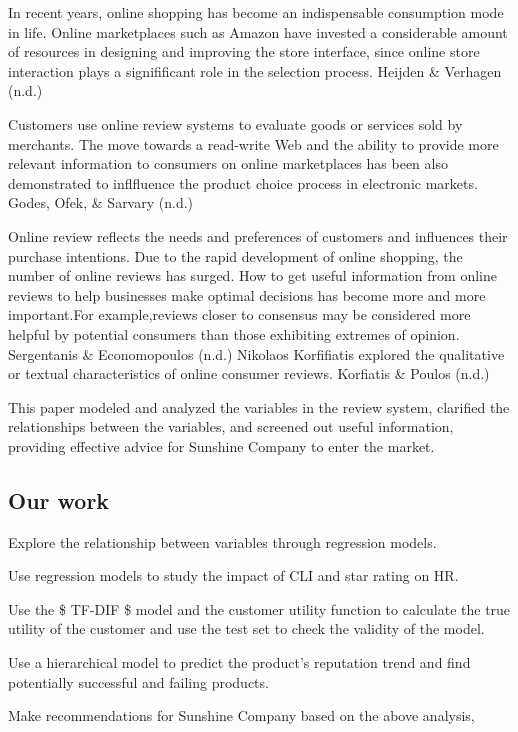 \documentclass[12pt,a4paper,]{article}
\begin{document}
In recent years, online shopping has become an indispensable consumption
mode in life. Online marketplaces such as Amazon have invested a
considerable amount of resources in designing and improving the store
interface, since online store interaction plays a signifificant role in
the selection process. Heijden \& Verhagen (n.d.)

Customers use online review systems to evaluate goods or services sold
by merchants. The move towards a read-write Web and the ability to
provide more relevant information to consumers on online marketplaces
has been also demonstrated to inflfluence the product choice process in
electronic markets. Godes, Ofek, \& Sarvary (n.d.)

Online review reflects the needs and preferences of customers and
influences their purchase intentions. Due to the rapid development of
online shopping, the number of online reviews has surged. How to get
useful information from online reviews to help businesses make optimal
decisions has become more and more important.For example,reviews closer
to consensus may be considered more helpful by potential consumers than
those exhibiting extremes of opinion. Sergentanis \& Economopoulos
(n.d.) Nikolaos Korfifiatis explored the qualitative or textual
characteristics of online consumer reviews. Korfiatis \& Poulos (n.d.)

This paper modeled and analyzed the variables in the review system,
clarified the relationships between the variables, and screened out
useful information, providing effective advice for Sunshine Company to
enter the market.

\hypertarget{our-work}{%
\subsection{Our work}\label{our-work}}

Explore the relationship between variables through regression models.

Use regression models to study the impact of CLI and star rating on HR.

Use the \$ TF-DIF \$ model and the customer utility function to
calculate the true utility of the customer and use the test set to check
the validity of the model.

Use a hierarchical model to predict the product's reputation trend and
find potentially successful and failing products.

Make recommendations for Sunshine Company based on the above analysis,
\end{document}

